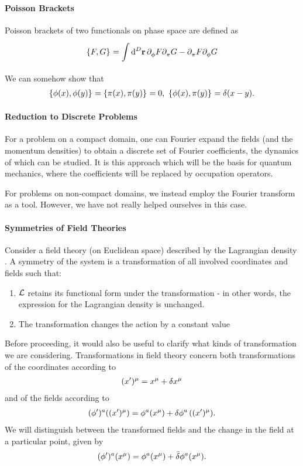 
\paragraph{Poisson Brackets}
Poisson brackets of two functionals on phase space are defined as
\begin{align*}
\left\{F, G\right\}_{} = \int\limits_{}^{}\dd[D]{\vb{r}}\partial^{}_{\phi}F\partial^{}_{\pi}G - \partial^{}_{\pi}F\partial^{}_{\phi}G
\end{align*}
We can somehow show that
\begin{align*}
\pob{\phi(x)}{\phi(y)} = \pob{\pi(x)}{\pi(y)} = 0,\ \pob{\phi(x)}{\pi(y)} = \delta(x - y).
\end{align*}

\paragraph{Reduction to Discrete Problems}
For a problem on a compact domain, one can Fourier expand the fields (and the momentum densities) to obtain a discrete set of Fourier coefficients, the dynamics of which can be studied. It is this approach which will be the basis for quantum mechanics, where the coefficients will be replaced by occupation operators.

For problems on non-compact domains, we instead employ the Fourier transform as a tool. However, we have not really helped ourselves in this case.

\paragraph{Symmetries of Field Theories}
Consider a field theory (on Euclidean space) described by the Lagrangian density \lag. A symmetry of the system is a transformation of all involved coordinates and fields such that:
\begin{enumerate}
	\item $\mathcal{L}$ retains its functional form under the transformation - in other words, the expression for the Lagrangian density is unchanged.
	\item The transformation changes the action by a constant value
\end{enumerate}

Before proceeding, it would also be useful to clarify what kinds of transformation we are considering. Transformations in field theory concern both transformations of the coordinates according to
\begin{align*}
	(x^{\prime})^{\mu} = x^{\mu} + \var{x^{\mu}}
\end{align*}
and of the fields according to
\begin{align*}
	(\phi^{\prime})^{a}((x^{\prime})^{\mu}) = \phi^{a}(x^{\mu}) + \var{\phi^{a}}((x^{\prime})^{\mu}).
\end{align*}
We will distinguish between the transformed fields and the change in the field at a particular point, given by
\begin{align*}
	(\phi^{\prime})^{a}(x^{\mu}) = \phi^{a}(x^{\mu}) + \bar{\delta}\phi^{a}(x^{\mu}).
\end{align*}

